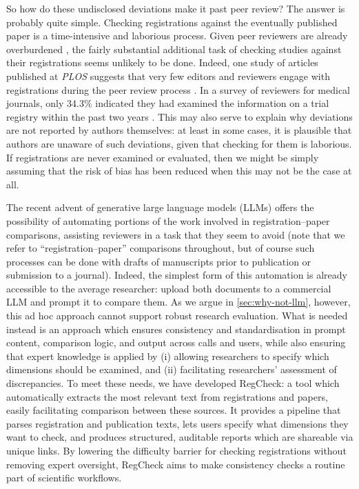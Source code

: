\documentclass{article}
\begin{document}
So how do these undisclosed deviations make it past peer review? The answer is
probably quite simple. Checking registrations against the eventually published
paper is a time-intensive and laborious process. Given peer reviewers are
already overburdened \citep{adam_peer-review_2025}, the fairly substantial
additional task of checking studies against their registrations seems unlikely
to be done. Indeed, one study of articles published at \emph{PLOS} suggests that
very few editors and reviewers engage with registrations during the peer review
process \citep[see also][]{syed_data_2025, spitzer_registered_2023}. In a survey
of reviewers for medical journals, only 34.3\% indicated they had examined the
information on a trial registry within the past two years
\citep{mathieu_use_2013}. This may also serve to explain why deviations are not
reported by authors themselves: at least in some cases, it is plausible that
authors are unaware of such deviations, given that checking for them is
laborious. If registrations are never examined or evaluated, then we might be
simply assuming that the risk of bias has been reduced when this may not be the
case at all.

The recent advent of generative large language models (LLMs) offers the
possibility of automating portions of the work involved in registration--paper
comparisons, assisting reviewers in a task that they seem to avoid (note that we
refer to ``registration--paper'' comparisons throughout, but of course such
processes can be done with drafts of manuscripts prior to publication or
submission to a journal). Indeed, the simplest form of this automation is
already accessible to the average researcher: upload both documents to a
commercial LLM and prompt it to compare them. As we argue in
\cref{sec:why-not-llm}, however, this ad hoc approach cannot support robust
research evaluation. What is needed instead is an approach which ensures
consistency and standardisation in prompt content, comparison logic, and output
across calls and users, while also ensuring that expert knowledge is applied by
(i) allowing researchers to specify which dimensions should be examined, and
(ii) facilitating researchers' assessment of discrepancies. To meet these needs,
we have developed RegCheck: a tool which automatically extracts the most
relevant text from registrations and papers, easily facilitating comparison
between these sources. It provides a pipeline that parses registration and
publication texts, lets users specify what dimensions they want to check, and
produces structured, auditable reports which are shareable via unique links. By
lowering the difficulty barrier for checking registrations without removing
expert oversight, RegCheck aims to make consistency checks a routine part of
scientific workflows.
\end{document}

